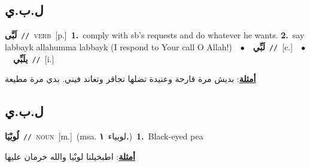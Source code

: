 \documentclass[10pt,a4paper,twoside]{article} %
\begin{document}
\begin{multicols}{2}
\vspace{-3mm}
\subsection*{\color{blue}\foreignlanguage{arabic}{ل.ب.ي}\color{blue}{}} 

{\setlength\topsep{0pt}\textbf{\foreignlanguage{arabic}{لَبَّى}}\ {\color{gray}\texttt{//}\color{black}}\ \textsc{verb}\ [p.]\ \textbf{1.}~comply with sb's requests and do whatever he wants.  \textbf{2.}~say  labbayk allahumma labbayk (I respond to Your call O Allah!)\ \ $\bullet$\ \ \setlength\topsep{0pt}\textbf{\foreignlanguage{arabic}{لَبِّي}}\ {\color{gray}\texttt{//}\color{black}}\ [c.]\ \ $\bullet$\ \ \setlength\topsep{0pt}\textbf{\foreignlanguage{arabic}{يلَبِّي}}\ {\color{gray}\texttt{//}\color{black}}\ [i.]\  \begin{flushright}\color{gray}\foreignlanguage{arabic}{\textbf{\underline{\foreignlanguage{arabic}{أمثلة}}}: بديش مرة قارحة وعنيدة تضلها تجاقر وتعاند فيني. بدي مرة مطيعة}\end{flushright}\color{black}} \vspace{2mm}

\vspace{-3mm}
\subsection*{\color{blue}\foreignlanguage{arabic}{ل.ب.ي}\color{blue}{ (ntws)}} 

{\setlength\topsep{0pt}\textbf{\foreignlanguage{arabic}{لُوبْيَا}}\ {\color{gray}\texttt{//}\color{black}}\ \textsc{noun}\ [m.]\ \color{gray}(msa. \foreignlanguage{arabic}{لوبياء}~\foreignlanguage{arabic}{\textbf{١.}})\color{black}\ \textbf{1.}~Black-eyed pea\  \begin{flushright}\color{gray}\foreignlanguage{arabic}{\textbf{\underline{\foreignlanguage{arabic}{أمثلة}}}: اطبخيلنا لوبْيا والله خرمان عليها}\end{flushright}\color{black}} \vspace{2mm}


\end{multicols}
\end{document}
